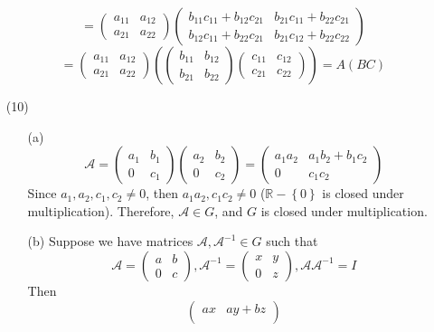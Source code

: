 \documentclass[12pt]{article}
\begin{document}
\begin{itemize}
$$= \begin{pmatrix}
a_{11} & a_{12} \\
a_{21} & a_{22}
\end{pmatrix}\begin{pmatrix}
b_{11}c_{11} + b_{12}c_{21} & b_{21}c_{11} + b_{22}c_{21}\\
b_{12}c_{11} + b_{22}c_{21} & b_{21}c_{12} + b_{22}c_{22}
\end{pmatrix}$$
$$= \begin{pmatrix}
a_{11} & a_{12} \\
a_{21} & a_{22}
\end{pmatrix} \left (\begin{pmatrix}
b_{11} & b_{12} \\
b_{21} & b_{22}
\end{pmatrix}\begin{pmatrix}
c_{11} & c_{12} \\
c_{21} & c_{22}
\end{pmatrix} \right) = A(BC)$$
\normalsize
\item[(10)]
\begin{itemize}
\item[(a)]
$$\mathcal{A} = \begin{pmatrix}
a_1 & b_1 \\
0 & c_1
\end{pmatrix}\begin{pmatrix}
a_2 & b_2 \\
0 & c_2
\end{pmatrix} = \begin{pmatrix}
a_1a_2 & a_1b_2 + b_1c_2 \\
0 & c_1c_2
\end{pmatrix}$$
Since $a_1, a_2, c_1, c_2 \neq 0$, then $a_1a_2, c_1c_2 \neq 0$ ($\mathbb{R} - \left\lbrace 0 \right\rbrace$ is closed under multiplication). Therefore, $\mathcal{A} \in G$, and $G$ is closed under multiplication.
\item[(b)]
Suppose we have matrices $\mathcal{A}, \mathcal{A}^{-1} \in G$ such that
$$\mathcal{A} = \begin{pmatrix}
a & b \\
0 & c
\end{pmatrix}, \mathcal{A}^{-1} = \begin{pmatrix}
x & y \\
0 & z
\end{pmatrix}, \mathcal{A}\mathcal{A}^{-1} = I$$
Then
$$\begin{pmatrix}
ax & ay + bz \\

\end{pmatrix}$$
\end{itemize}
\end{itemize}
\end{document}
